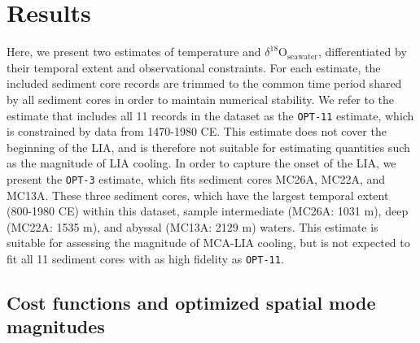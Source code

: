 \documentclass[draft]{agujournal2019}
\begin{document}
\section{Results}
Here, we present two estimates of temperature and $\delta^{18}\mathrm{O}_{\mathrm{seawater}}$, differentiated by their temporal extent and observational constraints. For each estimate, the included sediment core records are trimmed to the common time period shared by all sediment cores in order to maintain numerical stability. We refer to the estimate that includes all 11 records in the  dataset as the \texttt{OPT-11} estimate, which is constrained by data from 1470-1980 CE. This estimate does not cover the beginning of the LIA, and is therefore not suitable for estimating quantities such as the magnitude of LIA cooling. In order to capture the onset of the LIA, we present the \texttt{OPT-3} estimate, which fits sediment cores MC26A, MC22A, and MC13A. These three sediment cores, which have the largest temporal extent (800-1980 CE) within this dataset, sample intermediate (MC26A: 1031 m), deep (MC22A: 1535 m), and abyssal (MC13A: 2129 m) waters. This estimate is suitable for assessing the magnitude of MCA-LIA cooling, but is not expected to fit all 11 sediment cores with as high fidelity as \texttt{OPT-11}.

\subsection{Cost functions and optimized spatial mode magnitudes \label{sec:solchar}}
\end{document}
